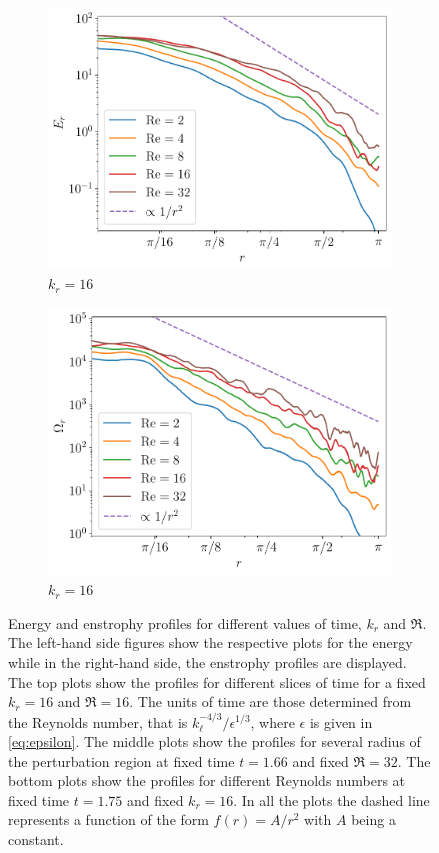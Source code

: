 \documentclass[../main.tex]{subfiles}
\begin{document}
\begin{figure}[!ht]
	\begin{subfigure}{0.44\textwidth}
		\centering
		\includegraphics[width=\textwidth]{images/Energy_Re.kdn16.175.pdf}
		\caption{$k_r = 16$}
	\end{subfigure}\hspace{0.04\textwidth}
	\begin{subfigure}{0.44\textwidth}
		\centering
		\includegraphics[width=\textwidth]{images/Enstrophy_Re.kdn16.175.pdf}
		\caption{$k_r = 16$}
	\end{subfigure}
	\caption{Energy and enstrophy profiles for different values of time, $k_r$ and $\Re$. The left-hand side figures show the respective plots for the energy while in the right-hand side, the enstrophy profiles are displayed. The top plots show the profiles for different slices of time for a fixed $k_r=16$ and $\Re=16$. The units of time are those determined from the Reynolds number, that is $k_\ell^{-4/3}/\epsilon^{1/3}$, where $\epsilon$ is given in \cref{eq:epsilon}. The middle plots show the profiles for several radius of the perturbation region at fixed time $t=1.66$ and fixed $\Re=32$. The bottom plots show the profiles for different Reynolds numbers at fixed time $t=1.75$ and fixed $k_r=16$. In all the plots the dashed line represents a function of the form $f(r)=A/r^2$ with $A$ being a constant.}\label{fig:energy_enstrophy}

\end{figure}
\end{document}
